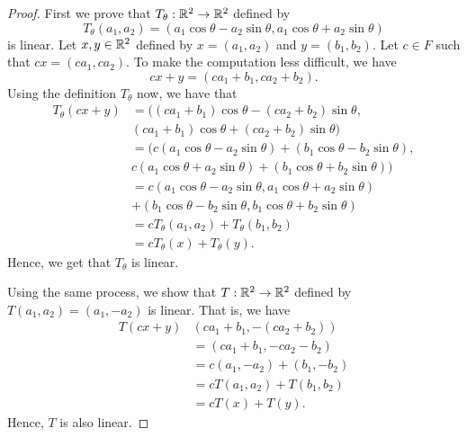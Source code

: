 \begin{proof}
    First we prove that \( T_{\theta}: \mathbb{R}^{2} \to \mathbb{R}^{2} \) defined by 
    \[  T_{\theta}(a_{1}, a_{2}) = (a_{1}\cos \theta - a_{2} \sin \theta, a_{1} \cos \theta + a_{2} \sin \theta) \]
    is linear. Let \( x,y \in \mathbb{R}^{2}  \) defined by \( x = (a_{1}, a_{2}) \) and \( y = (b_{1}, b_{2}) \). Let \( c \in F  \) such that \( cx = (ca_{1}, ca_{2}) \). To make the computation less difficult, we have
    \[  cx + y = (ca_{1} + b_{1}, ca_{2} + b_{2}). \]
    Using the definition \( T_{\theta} \) now, we have that 
    \begin{align*}
        T_{\theta}(cx + y) &= ((ca_{1} + b_{1})\cos \theta - (ca_{2} + b_{2}) \sin \theta,  \\
                           &(ca_{1} + b_{1}) \cos \theta + (ca_{2} + b_{2}) \sin \theta ) \\
                           &= (c (a_{1}\cos \theta  - a_{2} \sin \theta) + (b_{1} \cos \theta - b_{2} \sin \theta ), \\
                           &c ( a_{1} \cos \theta + a_{2} \sin \theta ) + (b_{1} \cos \theta + b_{2} \sin \theta)           ) \\
                           &= c (a_{1} \cos \theta - a_{2} \sin \theta, a_{1} \cos \theta + a_{2} \sin \theta)  \\
                           &+ (b_{1} \cos \theta - b_{2} \sin \theta , b_{1} \cos \theta + b_{2} \sin \theta) \\
                           &= c T_{\theta}(a_{1}, a_{2}) + T_{\theta}(b_{1}, b_{2}) \\
                           &= c T_{\theta}(x) + T_{\theta}(y).
    \end{align*}
    Hence, we get that \( T_{\theta} \) is linear.

    Using the same process, we show that \( T: \mathbb{R}^{2} \to \mathbb{R}^{2}  \) defined by \( T(a_{1}, a_{2}) = (a_{1}, - a_{2})\) is linear. That is, we have
    \begin{align*}
        T(cx + y) & (ca_{1} + b_{1}, - (ca_{2} + b_{2})) \\
                  &= (ca_{1} + b_{1}, -ca_{2} - b_{2}) \\ 
                  &= c(a_{1}, -a_{2}) + (b_{1}, -b_{2}) \\
                  &= c T(a_{1}, a_{2}) + T(b_{1}, b_{2}) \\
                  &= cT(x) + T(y).
    \end{align*}
    Hence, \( T  \) is also linear.
\end{proof}



